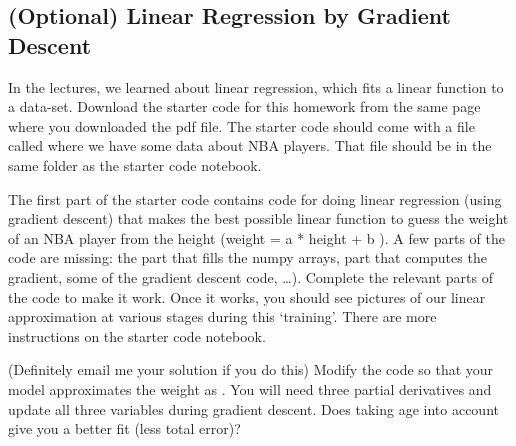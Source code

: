 \documentclass[letterpaper,11pt]{amsart}
\theoremstyle{plain}
\theoremstyle{definition}
\begin{document}
\subsection*{(Optional) Linear Regression by Gradient Descent} In the lectures, we learned about linear regression, which fits a linear function to a data-set. Download the starter code for this homework from the same page where you downloaded the pdf file. The starter code should come with a file called  where we have some data about NBA players. That file should be in the same folder as the starter code notebook.

The first part of the starter code contains code for doing linear regression (using gradient descent) that makes the best possible linear function to guess the weight of an NBA player from the height (weight = a * height +  b ). A few parts of the code are missing: the part that fills the numpy arrays, part that computes the gradient, some of the gradient descent code, \dots). Complete the relevant parts of the code to make it work. Once it works, you should see pictures of our linear approximation at various stages during this `training'. There are more instructions on the starter code notebook. 

(Definitely email me your solution if you do this) Modify the code so that your model approximates the weight as . You will need three partial derivatives and update all three variables during gradient descent. Does taking age into account give you a better fit (less total error)? 






    
    
\end{document}
